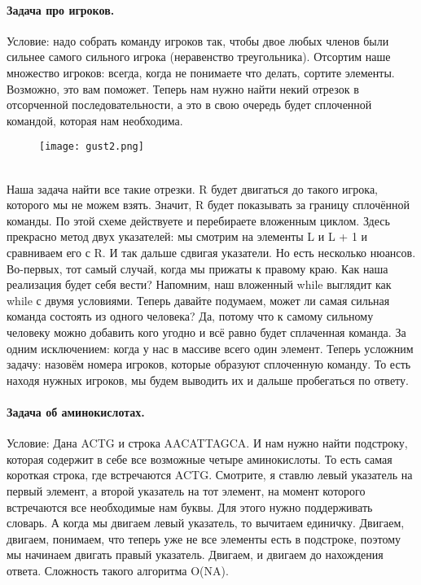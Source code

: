 \documentclass[a4paper,12pt]{article}
\begin{document}
\paragraph{Задача про игроков.}
Условие: надо собрать команду игроков так, чтобы двое любых членов были сильнее самого сильного игрока (неравенство треугольника). Отсортим наше множество игроков: всегда, когда не понимаете что делать, сортите элементы. Возможно, это вам поможет. Теперь нам нужно найти некий отрезок в отсорченной последовательности, а это в свою очередь будет сплоченной командой, которая нам необходима.
\\
\begin{figure}[h]
\centering
\texttt{[image: gust2.png]}
\label{fig:mpr}
\end{figure}
\\
Наша задача найти все такие отрезки. R будет двигаться до такого игрока, которого мы не можем взять. Значит, R будет показывать за границу сплочённой команды. По этой схеме действуете и перебираете вложенным циклом. Здесь прекрасно метод двух указателей: мы смотрим на элементы L и L + 1 и сравниваем его с R. И так дальше сдвигая указатели. Но есть несколько нюансов. Во-первых, тот самый случай, когда мы прижаты к правому краю. Как наша реализация будет себя вести? Напомним, наш вложенный while выглядит как while с двумя условиями. Теперь давайте подумаем, может ли самая сильная команда состоять из одного человека? Да, потому что к самому сильному человеку можно добавить кого угодно и всё равно будет сплаченная команда. За одним исключением: когда у нас в массиве всего один элемент. Теперь усложним задачу: назовём номера игроков, которые образуют сплоченную команду. То есть находя нужных игроков, мы будем выводить их и дальше пробегаться по ответу.
\paragraph{Задача об аминокислотах.}
Условие: Дана ACTG и строка AACATTAGCA. И нам нужно найти подстроку, которая содержит в себе все возможные четыре аминокислоты. То есть самая короткая строка, где встречаются ACTG. Смотрите, я ставлю левый указатель на первый элемент, а второй указатель на тот элемент, на момент которого встречаются все необходимые нам буквы. Для этого нужно поддерживать словарь. А когда мы двигаем левый указатель, то вычитаем единичку. Двигаем, двигаем, понимаем, что теперь уже не все элементы есть в подстроке, поэтому мы начинаем двигать правый указатель. Двигаем, и двигаем до нахождения ответа. Сложность такого алгоритма O(NA). 
\end{document}
